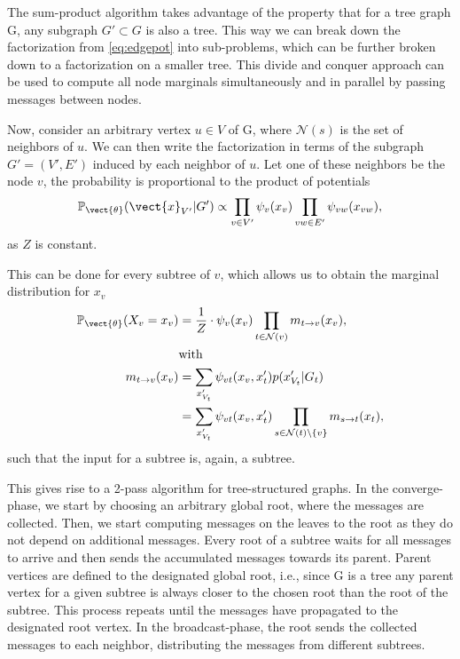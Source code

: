 The sum-product algorithm takes advantage of the property that for a tree graph G, any subgraph $G' \subset G$ is also a tree. 
This way we can break down the factorization from \eq\ref{eq:edgepot} into sub-problems, which can be further broken down to a factorization on a smaller tree.
This divide and conquer approach can be used to compute all node marginals simultaneously and in parallel by passing messages between nodes.

Now, consider an arbitrary vertex $u \in V$ of G, where $\mathcal{N}(s)$ is the set of neighbors of $u$.
We can then write the factorization in terms of the subgraph $G'=(V', E')$ induced by each neighbor of $u$. 
Let one of these neighbors be the node $v$, the probability is proportional to the product of potentials
\begin{equation}
    \mathbb{P}_{\vect{\theta}}(\vect{x}_{V'}\lvert G') \propto \prod_{v \in V'} \psi_v(x_v) \prod_{vw \in E'} \psi_{vw}(x_{vw}),
\end{equation}
as $Z$ is constant.

This can be done for every subtree of $v$, which allows us to obtain the marginal distribution for $x_v$
\begin{equation}
    \label{eq:normbp}
    \begin{split}
    \mathbb{P}_{\vect{\theta}}(X_v = x_v) &= \frac{1}{Z} \cdot \psi_v(x_v) \prod_{t \in \mathcal{N}(v)} m_{t \rightarrow v}(x_v),  \\
    & \text{with}\\
    m_{t \rightarrow v}(x_v) &= \sum_{x'_{V_t}} \psi_{vt}(x_v, x_t') p(x'_{V_t} \lvert G_t) \\
    & = \sum_{x'_{V_t}} \psi_{vt}(x_v, x_t')  \prod_{s\in \mathcal{N}(t) \setminus \{v\}} m_{s \rightarrow t}(x_t),
    \end{split}
\end{equation}
such that the input for a subtree is, again, a subtree.

This gives rise to a 2-pass algorithm for tree-structured graphs.
In the converge-phase, we start by choosing an arbitrary global root, where the messages are collected.
Then, we start computing messages on the leaves \wrt to the root as they do not depend on additional messages.
Every root of a subtree waits for all messages to arrive and then sends the accumulated messages towards its parent. 
Parent vertices are defined \wrt to the designated global root, i.e., since G is a tree any parent vertex for a given subtree is always closer to the chosen root than the root of the subtree.
This process repeats until the messages have propagated to the designated root vertex.
In the broadcast-phase, the root sends the collected messages to each neighbor, distributing the messages from different subtrees.

